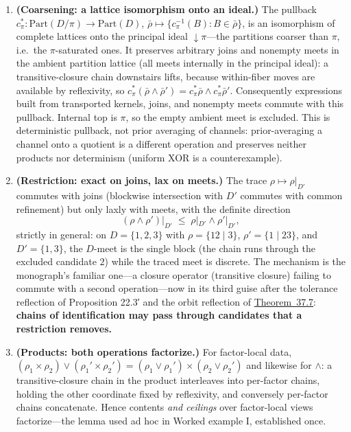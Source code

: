 \begin{thmplain}

\par\nopagebreak

\begin{enumerate}
\def\labelenumi{\arabic{enumi}.}
\item
  \textbf{(Coarsening: a lattice isomorphism onto an ideal.)} The pullback \(c_\pi^* : \mathrm{Part}(D/\pi) \to \mathrm{Part}(D)\), \(\bar\rho \mapsto \{c_\pi^{-1}(B) : B \in \bar\rho\}\), is an isomorphism of complete lattices onto the principal ideal \({\downarrow}\pi\)---\hspace{0pt}the partitions coarser than \(\pi\), i.e.~the \(\pi\)-saturated ones. It preserves arbitrary joins and nonempty meets in the ambient partition lattice (all meets internally in the principal ideal): a transitive-closure chain downstairs lifts, because within-fiber moves are available by reflexivity, so \(c_\pi^*(\bar\rho \wedge \bar\rho') = c_\pi^*\bar\rho \wedge c_\pi^*\bar\rho'\). Consequently expressions built from transported kernels, joins, and nonempty meets commute with this pullback. Internal top is \(\pi\), so the empty ambient meet is excluded. This is deterministic pullback, not prior averaging of channels: prior-averaging a channel onto a quotient is a different operation and preserves neither products nor determinism (uniform XOR is a counterexample).
\item
  \textbf{(Restriction: exact on joins, lax on meets.)} The trace \(\rho \mapsto \rho|_{D'}\) commutes with joins (blockwise intersection with \(D'\) commutes with common refinement) but only laxly with meets, with the definite direction
  \[
  (\rho \wedge \rho')\big|_{D'} \;\le\; \rho|_{D'} \wedge \rho'|_{D'},
  \]
  strictly in general: on \(D = \{1,2,3\}\) with \(\rho = \{12 \mid 3\}\), \(\rho' = \{1 \mid 23\}\), and \(D' = \{1,3\}\), the \(D\)-meet is the single block (the chain runs through the excluded candidate \(2\)) while the traced meet is discrete. The mechanism is the monograph's familiar one---\hspace{0pt}a closure operator (transitive closure) failing to commute with a second operation---\hspace{0pt}now in its third guise after the tolerance reflection of Proposition 22.3′ and the orbit reflection of \hyperlink{stmt:37.7}{Theorem~37.7}: \textbf{chains of identification may pass through candidates that a restriction removes.}
\item
  \textbf{(Products: both operations factorize.)} For factor-local data, \((\rho_1 \times \rho_2) \vee (\rho_1' \times \rho_2') = (\rho_1 \vee \rho_1') \times (\rho_2 \vee \rho_2')\) and likewise for \(\wedge\): a transitive-closure chain in the product interleaves into per-factor chains, holding the other coordinate fixed by reflexivity, and conversely per-factor chains concatenate. Hence contents \emph{and ceilings} over factor-local views factorize---\hspace{0pt}the lemma used ad hoc in Worked example I, established once.
\end{enumerate}
\end{thmplain}

